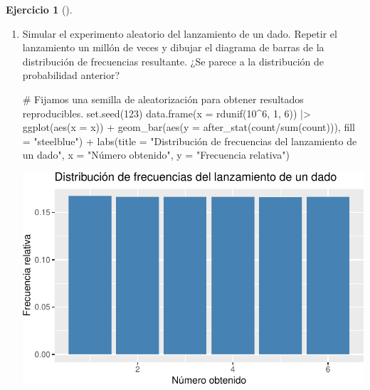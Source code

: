 \documentclass[
  a4paper,
]{scrreport}
\newenvironment{Shaded}{\begin{snugshade}}{\end{snugshade}}
\newcommand{\AttributeTok}[1]{\textcolor[rgb]{0.40,0.45,0.13}{#1}}
\newcommand{\CommentTok}[1]{\textcolor[rgb]{0.37,0.37,0.37}{#1}}
\newcommand{\DecValTok}[1]{\textcolor[rgb]{0.68,0.00,0.00}{#1}}
\newcommand{\FunctionTok}[1]{\textcolor[rgb]{0.28,0.35,0.67}{#1}}
\newcommand{\NormalTok}[1]{\textcolor[rgb]{0.00,0.23,0.31}{#1}}
\newcommand{\SpecialCharTok}[1]{\textcolor[rgb]{0.37,0.37,0.37}{#1}}
\newcommand{\StringTok}[1]{\textcolor[rgb]{0.13,0.47,0.30}{#1}}
\theoremstyle{definition}
\newtheorem{exercise}{Ejercicio}[chapter]
\theoremstyle{remark}
\begin{document}
\begin{exercise}[]
\begin{enumerate}
\begin{tcolorbox}
  \end{tcolorbox}
\item
  Simular el experimento aleatorio del lanzamiento de un dado. Repetir
  el lanzamiento un millón de veces y dibujar el diagrama de barras de
  la distribución de frecuencias resultante. ¿Se parece a la
  distribución de probabilidad anterior?

  \begin{tcolorbox}[enhanced jigsaw, toprule=.15mm, rightrule=.15mm, arc=.35mm, colback=white, colbacktitle=quarto-callout-tip-color!10!white, toptitle=1mm, left=2mm, colframe=quarto-callout-tip-color-frame, opacityback=0, breakable, opacitybacktitle=0.6, bottomtitle=1mm, titlerule=0mm, title=\textcolor{quarto-callout-tip-color}{\faLightbulb}\hspace{0.5em}{Solución}, bottomrule=.15mm, coltitle=black, leftrule=.75mm]

\begin{Shaded}
\begin{Highlighting}[]
\CommentTok{\# Fijamos una semilla de aleatorización para obtener resultados reproducibles.}
\FunctionTok{set.seed}\NormalTok{(}\DecValTok{123}\NormalTok{)}
\FunctionTok{data.frame}\NormalTok{(}\AttributeTok{x =} \FunctionTok{rdunif}\NormalTok{(}\DecValTok{10}\SpecialCharTok{\^{}}\DecValTok{6}\NormalTok{, }\DecValTok{1}\NormalTok{, }\DecValTok{6}\NormalTok{))  }\SpecialCharTok{|\textgreater{}} 
    \FunctionTok{ggplot}\NormalTok{(}\FunctionTok{aes}\NormalTok{(}\AttributeTok{x =}\NormalTok{ x)) }\SpecialCharTok{+}
    \FunctionTok{geom\_bar}\NormalTok{(}\FunctionTok{aes}\NormalTok{(}\AttributeTok{y =} \FunctionTok{after\_stat}\NormalTok{(count}\SpecialCharTok{/}\FunctionTok{sum}\NormalTok{(count))), }\AttributeTok{fill =} \StringTok{"steelblue"}\NormalTok{) }\SpecialCharTok{+}
    \FunctionTok{labs}\NormalTok{(}\AttributeTok{title =} \StringTok{"Distribución de frecuencias del lanzamiento de un dado"}\NormalTok{, }\AttributeTok{x =} \StringTok{"Número obtenido"}\NormalTok{, }\AttributeTok{y =} \StringTok{"Frecuencia relativa"}\NormalTok{)}
\end{Highlighting}
\end{Shaded}

  \includegraphics{06-distribuciones-probabilidad_files/figure-pdf/unnamed-chunk-3-1.pdf}


\end{tcolorbox}
\end{enumerate}
\end{exercise}
\end{document}
